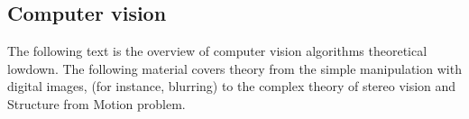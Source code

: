 \documentclass[../../../main]{subfiles}
\begin{document}
\subsection{Computer vision}

The following text is the overview of computer vision algorithms theoretical lowdown. The following material covers theory from the simple manipulation with digital images, (for instance, blurring) to the complex theory of stereo vision and Structure from Motion problem.


\newpage


\newpage
\end{document}
